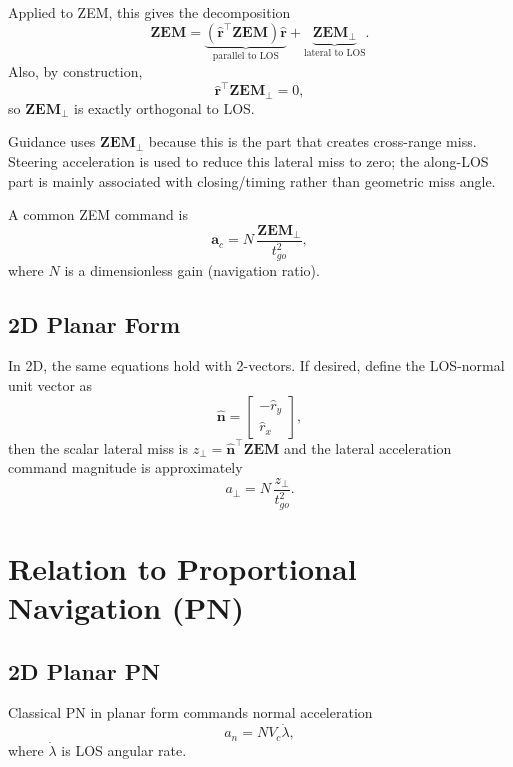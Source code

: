 \documentclass[11pt,a4paper]{article}
\begin{document}
Applied to ZEM, this gives the decomposition
\begin{equation}
\mathbf{ZEM} = \underbrace{(\hat{\mathbf{r}}^\top\mathbf{ZEM})\hat{\mathbf{r}}}_{\text{parallel to LOS}} + \underbrace{\mathbf{ZEM}_{\perp}}_{\text{lateral to LOS}}.
\end{equation}
Also, by construction,
\begin{equation}
\hat{\mathbf{r}}^\top\mathbf{ZEM}_{\perp} = 0,
\end{equation}
so $\mathbf{ZEM}_{\perp}$ is exactly orthogonal to LOS.

Guidance uses $\mathbf{ZEM}_{\perp}$ because this is the part that creates cross-range miss. Steering acceleration is used to reduce this lateral miss to zero; the along-LOS part is mainly associated with closing/timing rather than geometric miss angle.

A common ZEM command is
\begin{equation}
\mathbf{a}_c = N\,\frac{\mathbf{ZEM}_{\perp}}{t_{go}^2},
\end{equation}
where $N$ is a dimensionless gain (navigation ratio).

\subsection{2D Planar Form}
In 2D, the same equations hold with 2-vectors. If desired, define the LOS-normal unit vector as
\begin{equation}
\hat{\mathbf{n}} = \begin{bmatrix} -\hat{r}_y \\ \hat{r}_x \end{bmatrix},
\end{equation}
then the scalar lateral miss is $z_{\perp}=\hat{\mathbf{n}}^\top\mathbf{ZEM}$ and the lateral acceleration command magnitude is approximately
\begin{equation}
a_{\perp} = N\,\frac{z_{\perp}}{t_{go}^2}.
\end{equation}

\section{Relation to Proportional Navigation (PN)}
\subsection{2D Planar PN}
Classical PN in planar form commands normal acceleration
\begin{equation}
a_n = N V_c \dot{\lambda},
\end{equation}
where $\dot{\lambda}$ is LOS angular rate.
\end{document}
